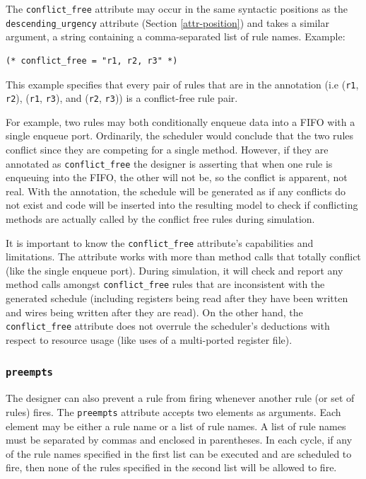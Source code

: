 \documentclass[twoside,letterpaper]{article}
\newcommand{\te}[1]{\texttt{#1}}
\begin{document}
The \te{conflict\_free} attribute may occur in the same syntactic
positions as the \te{descending\_urgency} attribute (Section
\ref{attr-position}) and takes a similar
argument, a string containing a comma-separated list of rule names.
Example:
\begin{verbatim}
(* conflict_free = "r1, r2, r3" *)
\end{verbatim}
This example specifies that every pair of rules that are in the annotation
(i.e (\te{r1}, \te{r2}), (\te{r1}, \te{r3}), and (\te{r2}, \te{r3})) is a
conflict-free rule pair. 


For example, two rules may both conditionally enqueue data into a FIFO with a 
single enqueue port. Ordinarily, the scheduler would conclude that the two 
rules conflict since they are competing for a single method. However, if they 
are annotated as \te{conflict\_free} the designer is asserting that when one 
rule is enqueuing into the FIFO, the other will not be, so the conflict is 
apparent, not real. With the annotation, the schedule will be generated as if 
any conflicts do not exist and code will be inserted into the resulting model 
to check if conflicting methods are actually called by the conflict free 
rules during simulation. 

It is important to know  the \te{conflict\_free} attribute's capabilities 
and limitations.  The attribute works with more than method calls that totally 
conflict (like the single enqueue port). During simulation, it will check and 
report any method calls amongst \te{conflict\_free} rules that are inconsistent 
with the generated schedule (including registers being read after they have 
been written and wires being written after they are read). On the other hand, 
the {\te{conflict\_free}} attribute does not overrule the scheduler's 
deductions with respect to resource usage (like uses of a multi-ported 
register file). 


\subsubsection{ \te{preempts}}

\label{preempts}
\index{preempts@\te{preempts} (attribute)}
The designer can also prevent a rule from firing whenever another rule
(or set of rules) fires.  The \te{preempts}
attribute accepts two elements as arguments.  Each element may be
either a rule name or a list of rule names.  A list of rule names must
be separated by commas and 
enclosed in  parentheses.
 In each cycle, if any of the rule  names
specified in  the first  list can  be executed and are scheduled to
fire, 
 then none of the rules  specified in the second list will be
allowed to  fire.
\end{document}
